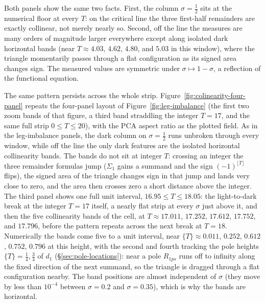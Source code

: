 \documentclass[11pt]{article}
\theoremstyle{definition}
\begin{document}
Both panels show the same two facts. First, the column $\sigma=\tfrac12$
sits at the numerical floor at every $T$: on the critical line the three
first-half remainders are exactly collinear, not merely nearly so. Second,
off the line the measures are many orders of magnitude larger everywhere
except along isolated dark horizontal bands (near $T\approx4.03$, $4.62$,
$4.80$, and $5.03$ in this window), where the triangle momentarily passes
through a flat configuration as its signed area changes sign. The measured
values are symmetric under $\sigma\mapsto1-\sigma$, a reflection of the
functional equation.

The same pattern persists across the whole strip.
Figure~\ref{fig:colinearity-four-panel} repeats the four-panel layout of
Figure~\ref{fig:leg-imbalance} (the first two zoom bands of that figure, a
third band straddling the integer $T=17$, and the same full strip
$0\le T\le20$), with the PCA aspect ratio as the plotted field.
As in the leg-imbalance panels, the dark column on $\sigma=\tfrac12$ runs
unbroken through every window, while off the line the only dark features are
the isolated horizontal collinearity bands. The bands do not sit at integer
$T$: crossing an integer the three remainder formulas jump ($\Sigma_1$ gains
a summand and the sign $(-1)^{\lfloor T\rfloor}$ flips), the signed area of
the triangle changes sign in that jump and lands very close to zero, and the
area then crosses zero a short distance above the integer. The third panel
shows one full unit interval, $16.95\le T\le18.05$: the light-to-dark break
at the integer $T=17$ itself, a nearly flat strip at every $\sigma$ just
above it, and then the five collinearity bands of the cell, at
$T\approx17.011$, $17.252$, $17.612$, $17.752$, and $17.796$, before the
pattern repeats across the next break at $T=18$. Numerically the bands come
five to a unit interval, near $\{T\}\approx0.011$, $0.252$, $0.612$,
$0.752$, $0.796$
at this height, with the second and fourth tracking the pole heights
$\{T\}=\tfrac14,\tfrac34$ of $d_1$ (\S\ref{sec:pole-locations}): near a pole
$R_{1ps}$ runs off to infinity along the fixed direction of the next
summand, so the triangle is dragged through a flat configuration nearby.
The band positions are almost independent of $\sigma$ (they move by less
than $10^{-4}$ between $\sigma=0.2$ and $\sigma=0.35$), which is why the
bands are horizontal.
\end{document}
